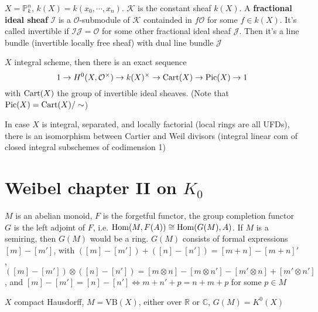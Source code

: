 \documentclass[main]{subfiles}
\begin{document}
\begin{example}
$X=\mathbb P^n_k$, $k(X)=k(x_0,\cdots,x_n)$. $\mathcal K$ is the constant sheaf $k(X)$. A \textbf{fractional ideal sheaf} $\mathcal I$ is a $\mathcal O$-submodule of $\mathcal K$ containded in $f\mathcal O$ for some $f\in k(X)$. It's called invertible if $\mathcal I\mathcal J=\mathcal O$ for some other fractional ideal sheaf $\mathcal J$. Then it's a line bundle (invertible locally free sheaf) with dual line bundle $\mathcal J$
\end{example}

\begin{proposition}
$X$ integral scheme, then there is an exact sequence
\[1\to H^0(X,\mathcal O^\times)\to k(X)^\times\to \operatorname{Cart}(X)\to\operatorname{Pic}(X)\to1\]
with $\operatorname{Cart}(X)$ the group of invertible ideal sheaves. (Note that $\operatorname{Pic}(X)=\operatorname{Cart}(X)/\sim$)
\end{proposition}

In case $X$ is integral, separated, and locally factorial (local rings are all UFDs), there is an isomorphism between Cartier and Weil divisors (integral linear com of closed integral subschemes of codimension 1)

\section{Weibel chapter II on $K_0$}

$M$ is an abelian monoid, $F$ is the forgetful functor, the group completion functor $G$ is the left adjoint of $F$, i.e. $\operatorname{Hom}(M,F(A))\cong\operatorname{Hom}(G(M),A)$. If $M$ is a semiring, then $G(M)$ would be a ring. $G(M)$ consists of formal expressions $[m]-[m']$, with $([m]-[m'])+([n]-[n'])=[m+n]-[m+n]'$, $([m]-[m'])\otimes([n]-[n'])=[m\otimes n]-[m\otimes n']-[m'\otimes n]+[m'\otimes n']$, and $[m]-[m']=[n]-[n']\iff m+n'+p=n+m+p$ for some $p\in M$

\begin{example}
$X$ compact Hausdorff, $M=\mathrm{VB}(X)$, either over $\mathbb R$ or $\mathbb C$, $G(M)=K^0(X)$
\end{example}
\end{document}
